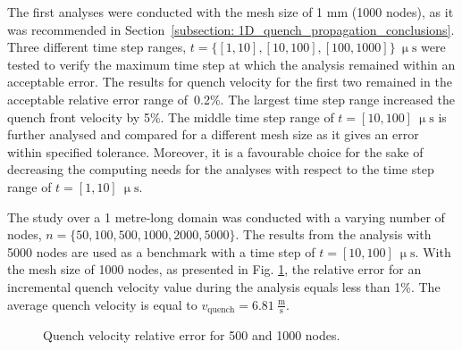 The first analyses were conducted with the mesh size of 1 mm (1000 nodes), as it was recommended in Section~\ref{subsection: 1D_quench_propagation_conclusions}. Three different time step ranges, $t=\{[1, 10], [10, 100], [100, 1000]\}~\upmu \text{s}$ were tested to verify the maximum time step at which the analysis remained within an acceptable error. The results for quench velocity for the first two remained in the acceptable relative error range of~0.2\%. The largest time step range increased the quench front velocity by 5\%. The middle time step range of $t=[10, 100]~\upmu \text{s}$ is further analysed and compared for a different mesh size as it gives an error within specified tolerance. Moreover, it is a favourable choice for the sake of decreasing the computing needs for the analyses with respect to the time step range of $t= [1, 10]~\upmu \text{s}$. 

The study over a 1 metre-long domain was conducted with a varying number of nodes, $n=\{50, 100, 500, 1000, 2000, 5000\}$. The results from the analysis with 5000 nodes are used as a benchmark with a time step of $t=[10, 100]~\upmu \text{s}$. With the mesh size of 1000 nodes, as presented in Fig. \ref{fig: q_vel_modelling_v_quench_rel_error_no_insulation}, the relative error for an incremental quench velocity value during the analysis equals less than 1\%. The average quench velocity is equal to $v_\text{quench}=6.81~\frac{\text{m}}{\text{s}}$.

\begin{figure}[H]
\centering
    \caption{Quench velocity relative error for 500 and 1000 nodes.}
    \label{fig: q_vel_modelling_v_quench_rel_error_no_insulation}
\end{figure}


